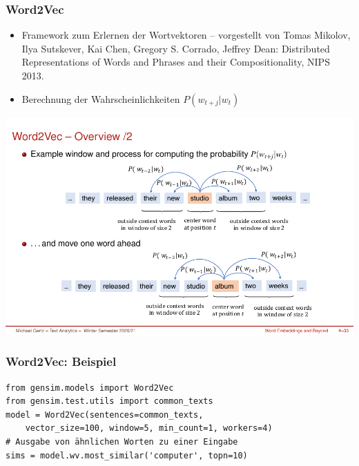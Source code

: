 
\begin{frame}
    \frametitle{Word2Vec}

    \begin{itemize}
        \item     Framework zum Erlernen der Wortvektoren -- vorgestellt von 
    Tomas Mikolov, Ilya Sutskever, Kai Chen, Gregory S. Corrado, Jeffrey Dean:
    Distributed Representations of Words and Phrases and their Compositionality, NIPS 2013.
    \item Berechnung der Wahrscheinlichkeiten $P(w_{t+j}|w_t)$
    \end{itemize}

    \centering\includegraphics[width=\linewidth]{fig8/we_computing.pdf}

\end{frame}


\begin{frame}[fragile]
    \frametitle{Word2Vec: Beispiel}

\begin{verbatim}
from gensim.models import Word2Vec
from gensim.test.utils import common_texts
model = Word2Vec(sentences=common_texts,
    vector_size=100, window=5, min_count=1, workers=4) 
# Ausgabe von ähnlichen Worten zu einer Eingabe
sims = model.wv.most_similar('computer', topn=10)
\end{verbatim}
\end{frame}


